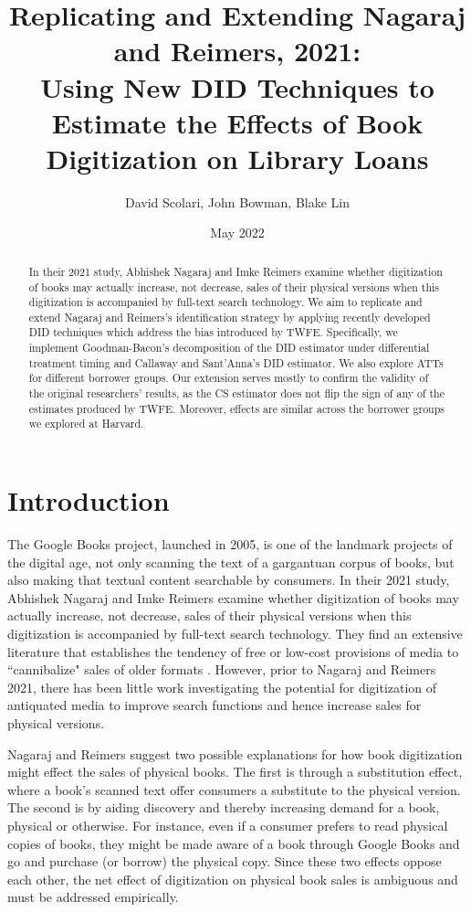 \documentclass{article}
\author{David Scolari, John Bowman, Blake Lin}
\title{Replicating and Extending Nagaraj and Reimers, 2021: \\
Using New DID Techniques to Estimate the Effects of Book Digitization on Library Loans}
\date{May 2022}
\begin{document}
\maketitle

\begin{abstract}
In their 2021 study, Abhishek Nagaraj and Imke Reimers examine whether digitization of books may actually increase, not decrease, sales of their physical versions when this digitization is accompanied by full-text search technology. We aim to replicate and extend Nagaraj and Reimers’s identification strategy by applying recently developed DID techniques which address the bias introduced by TWFE. Specifically, we implement Goodman-Bacon’s decomposition of the DID estimator under differential treatment timing and Callaway and Sant’Anna’s DID estimator. We also explore ATTs for different borrower groups. Our extension serves mostly to confirm the validity of the original researchers’ results, as the CS estimator does not flip the sign of any of the estimates produced by TWFE. Moreover, effects are similar across the borrower groups  we explored at Harvard.
\end{abstract}

\section{Introduction}
The Google Books project, launched in 2005, is one of the landmark projects of the digital age, not only scanning the text of a gargantuan corpus of books, but also making that textual content searchable by consumers. In their 2021 study, Abhishek Nagaraj and Imke Reimers examine whether digitization of books may actually increase, not decrease, sales of their physical versions when this digitization is accompanied by full-text search technology. They find an extensive literature that establishes the tendency of free or low-cost provisions of media to ``cannibalize" sales of older formats \cite{nagaraj2021digitization}. However, prior to Nagaraj and Reimers 2021, there has been little work investigating the potential for digitization of antiquated media to improve search functions and hence increase sales for physical versions. 

Nagaraj and Reimers  suggest two possible explanations for how book digitization might effect the sales of physical books. The first is through a substitution effect, where a book's scanned text offer consumers a substitute to the physical version. The second is by aiding discovery and thereby increasing demand for a book, physical or otherwise. For instance, even if a consumer prefers to read physical copies of books, they might be made aware of a book through Google Books and go and purchase (or borrow) the physical copy. Since these two effects oppose each other, the net effect of digitization on physical book sales is ambiguous and must be addressed empirically.
\end{document}
